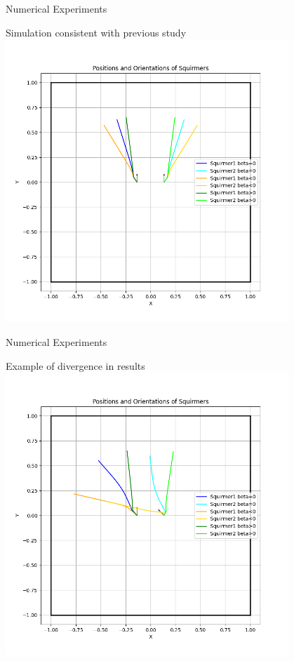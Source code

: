 \documentclass{beamer}
\begin{document}
\begin{frame}{Numerical Experiments}
    \begin{center}
        Simulation consistent with previous study \cite{Stark}
        \includegraphics[width=0.8\textwidth]{../../graphs/simulations/twosquirmerinter/sq2.pi.2.png}
    \end{center}
\end{frame}

\begin{frame}{Numerical Experiments}
    \begin{center}
        Example of divergence in results
        \includegraphics[width=0.8\textwidth]{../../graphs/simulations/twosquirmerinter/sq2.3pi.4.png}
    \end{center}
\end{frame}
\end{document}
